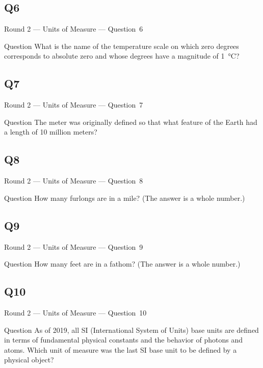 \documentclass[11pt]{beamer}
\begin{document}
\subsection*{Q6}
\begin{frame}[t]{Round 2 --- Units of Measure --- \mbox{Question 6}}
\vspace{-0.5em}
\begin{block}{Question}
What is the name of the temperature scale on which zero degrees corresponds to absolute zero and whose degrees have a magnitude of \SI{1}{\celsius}?
\end{block}
\end{frame}
\subsection*{Q7}
\begin{frame}[t]{Round 2 --- Units of Measure --- \mbox{Question 7}}
\vspace{-0.5em}
\begin{block}{Question}
The meter was originally defined so that what feature of the Earth had a length of 10 million meters?
\end{block}
\end{frame}
\subsection*{Q8}
\begin{frame}[t]{Round 2 --- Units of Measure --- \mbox{Question 8}}
\vspace{-0.5em}
\begin{block}{Question}
How many furlongs are in a mile? (The answer is a whole number.)
\end{block}
\end{frame}
\subsection*{Q9}
\begin{frame}[t]{Round 2 --- Units of Measure --- \mbox{Question 9}}
\vspace{-0.5em}
\begin{block}{Question}
How many feet are in a fathom? (The answer is a whole number.)
\end{block}
\end{frame}
\subsection*{Q10}
\begin{frame}[t]{Round 2 --- Units of Measure --- \mbox{Question 10}}
\vspace{-0.5em}
\begin{block}{Question}
As of 2019, all SI (International System of Units) base units are defined in terms of fundamental physical constants and the behavior of photons and atoms. Which unit of measure was the last SI base unit to be defined by  a physical object?
\end{block}
\end{frame}
\end{document}
